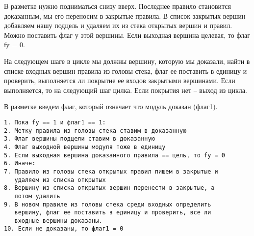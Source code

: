 В разметке нужно подниматься снизу вверх. Последнее правило становится доказанным, мы его переносим в закрытые правила. В список закрытых вершин добавляем нашу подцель и удаляем их из стека открытых вершин и правил. Можно поставить флаг у этой вершины. Если выходная вершина целевая, то флаг fy = 0.

На следующем шаге в цикле мы должны вершину, которую мы доказали, найти в списке входных вершин правила из головы стека, флаг ее поставить в единицу и проверить, выполняется ли покрытие ее входов закрытыми вершинами. Если выполняется, то на следующий шаг цилка. Если покрытия нет -- выход из цикла.

В разметке введем флаг, который означает что модуль доказан (флаг1).

\begin{verbatim}    
1. Пока fy == 1 и флаг1 == 1:
2. Метку правила из головы стека ставим в доказанную
3. Флаг вершины подцели ставим в доказанную
4. Флаг выходной вершины модуля тоже в единицу
5. Если выходная вершина доказанного правила == цель, то fy = 0
6. Иначе:
7. Правило из головы стека открытых правил пишем в закрытые и
   удаляем из списка открытых
8. Вершину из списка открытых вершин перенести в закрытые, а
   потом удалить
9. В новом правиле из головы стека среди входных определить
   вершину, флаг ее поставить в единицу и проверить, все ли
   входные вершины доказаны.
10. Если не доказаны, то флаг1 = 0
\end{verbatim}
